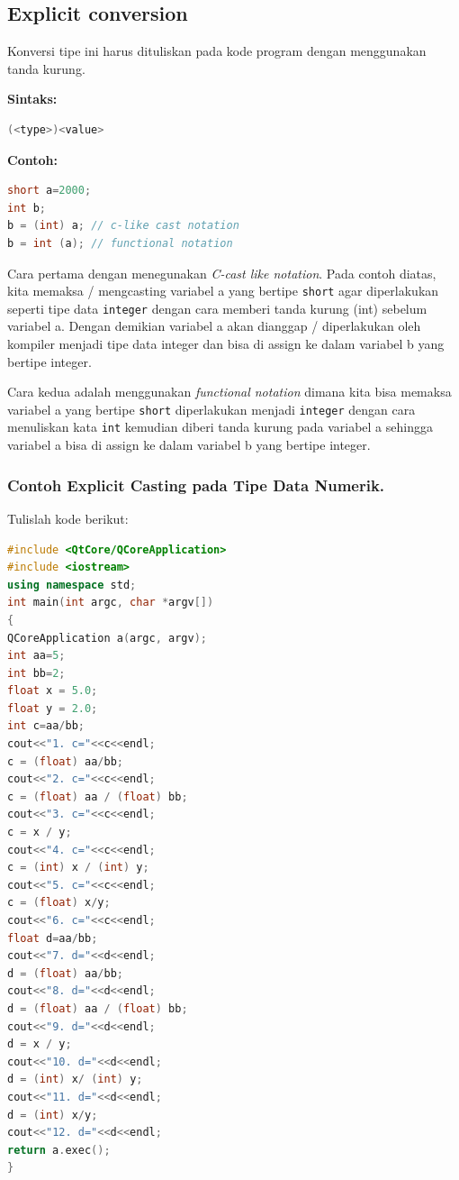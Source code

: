 \subsection{Explicit conversion}\label{explicit-conversion}

Konversi tipe ini harus dituliskan pada kode program dengan menggunakan
tanda kurung.

\textbf{Sintaks:}

\begin{lstlisting}[language=c++, numbers=none]
(<type>)<value>
\end{lstlisting}

\textbf{Contoh:}

\begin{lstlisting}[language=c++, numbers=none]
short a=2000;
int b;
b = (int) a; // c-like cast notation
b = int (a); // functional notation
\end{lstlisting}

Cara pertama dengan menegunakan \emph{C-cast like notation}. Pada contoh
diatas, kita memaksa / mengcasting variabel a yang bertipe
\texttt{short} agar diperlakukan seperti tipe data \texttt{integer}
dengan cara memberi tanda kurung (int) sebelum variabel a. Dengan
demikian variabel a akan dianggap / diperlakukan oleh kompiler menjadi
tipe data integer dan bisa di assign ke dalam variabel b yang bertipe
integer.

Cara kedua adalah menggunakan \emph{functional notation} dimana kita
bisa memaksa variabel a yang bertipe \texttt{short} diperlakukan menjadi
\texttt{integer} dengan cara menuliskan kata \texttt{int} kemudian
diberi tanda kurung pada variabel a sehingga variabel a bisa di assign
ke dalam variabel b yang bertipe integer.

\subsubsection*{Contoh Explicit Casting pada Tipe Data Numerik.}

Tulislah kode berikut:

\begin{lstlisting}[language=c++, caption=Explicit Casting pada Tipe Data Numerik]
#include <QtCore/QCoreApplication>
#include <iostream>
using namespace std;
int main(int argc, char *argv[])
{
QCoreApplication a(argc, argv);
int aa=5;
int bb=2;
float x = 5.0;
float y = 2.0;
int c=aa/bb;
cout<<"1. c="<<c<<endl;
c = (float) aa/bb;
cout<<"2. c="<<c<<endl;
c = (float) aa / (float) bb;
cout<<"3. c="<<c<<endl;
c = x / y;
cout<<"4. c="<<c<<endl;
c = (int) x / (int) y;
cout<<"5. c="<<c<<endl;
c = (float) x/y;
cout<<"6. c="<<c<<endl;
float d=aa/bb;
cout<<"7. d="<<d<<endl;
d = (float) aa/bb;
cout<<"8. d="<<d<<endl;
d = (float) aa / (float) bb;
cout<<"9. d="<<d<<endl;
d = x / y;
cout<<"10. d="<<d<<endl;
d = (int) x/ (int) y;
cout<<"11. d="<<d<<endl;
d = (int) x/y;
cout<<"12. d="<<d<<endl;
return a.exec();
}
\end{lstlisting}

